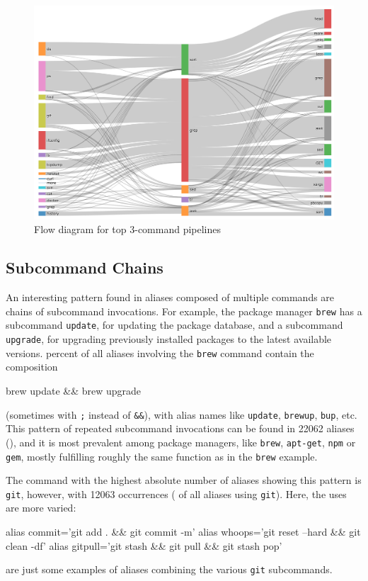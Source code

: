 \begin{figure}[h]
	\centering    
	\includegraphics[width=0.9\linewidth]{figures/flow_250.png}
	\caption{Flow diagram for top 3-command pipelines}
	\label{fig:flow}
\end{figure}

\subsection{Subcommand Chains}

An interesting pattern found in aliases composed of multiple commands are chains of subcommand invocations.
For example, the package manager \verb|brew| has a subcommand \verb|update|, for updating the package database, and a subcommand \verb|upgrade|, for upgrading previously installed packages to the latest available versions.
 percent of all aliases involving the \verb|brew| command contain the composition
\begin{CVerbatim}
brew update && brew upgrade
\end{CVerbatim}
(sometimes with \verb|;| instead of \verb|&&|), with alias names like \verb|update|, \verb|brewup|, \verb|bup|, etc.
This pattern of repeated subcommand invocations can be found in \num{22062} aliases (), and it is most prevalent among package managers, like \verb|brew|, \verb|apt-get|, \verb|npm| or \verb|gem|, mostly fulfilling roughly the same function as in the \verb|brew| example.

The command with the highest absolute number of aliases showing this pattern is \verb|git|, however, with \num{12063} occurrences ( of all aliases using \verb|git|).
Here, the uses are more varied:
\begin{CVerbatim}
alias commit='git add . && git commit -m'
alias whoops='git reset --hard && git clean -df'
alias gitpull='git stash && git pull && git stash pop'
\end{CVerbatim}
are just some examples of aliases combining the various \verb|git| subcommands.

